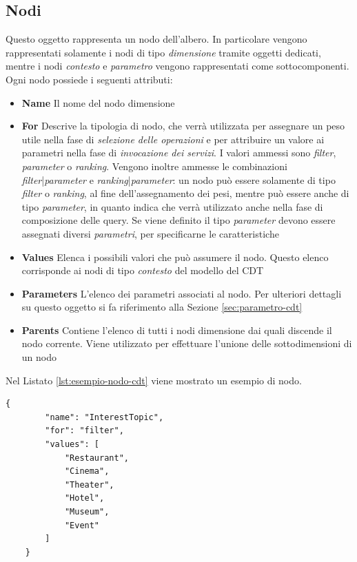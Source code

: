 \subsection{Nodi\label{sec:nodo-cdt}}

Questo oggetto rappresenta un nodo dell'albero. In particolare vengono rappresentati solamente i nodi di tipo \emph{dimensione} tramite oggetti dedicati, mentre i nodi \emph{contesto} e \emph{parametro} vengono rappresentati come sottocomponenti. Ogni nodo possiede i seguenti attributi:

\begin{itemize}
	\item \textbf{Name} Il nome del nodo dimensione
	\item \textbf{For} Descrive la tipologia di nodo, che verrà utilizzata per assegnare un peso utile nella fase di \emph{selezione delle operazioni} e per attribuire un valore ai parametri nella fase di \emph{invocazione dei servizi}. I valori ammessi sono \emph{filter}, \emph{parameter} o \emph{ranking}. Vengono inoltre ammesse le combinazioni \emph{filter}|\emph{parameter} e \emph{ranking}|\emph{parameter}: un nodo può essere solamente di tipo \emph{filter} o \emph{ranking}, al fine dell'assegnamento dei pesi, mentre può essere anche di tipo \emph{parameter}, in quanto indica che verrà utilizzato anche nella fase di composizione delle query. Se viene definito il tipo \emph{parameter} devono essere assegnati diversi \emph{parametri}, per specificarne le caratteristiche
	\item \textbf{Values} Elenca i possibili valori che può assumere il nodo. Questo elenco corrisponde ai nodi di tipo \emph{contesto} del modello del CDT
	\item \textbf{Parameters} L'elenco dei parametri associati al nodo. Per ulteriori dettagli su questo oggetto si fa riferimento alla Sezione \ref{sec:parametro-cdt}
	\item \textbf{Parents} Contiene l'elenco di tutti i nodi dimensione dai quali discende il nodo corrente. Viene utilizzato per effettuare l'unione delle sottodimensioni di un nodo
\end{itemize}

Nel Listato \ref{lst:esempio-nodo-cdt} viene mostrato un esempio di nodo.

\begin{lstlisting}[style=blocco-esempi,
								caption=Esempio di nodo del CDT,
								label=lst:esempio-nodo-cdt]
	{
		"name": "InterestTopic",
		"for": "filter",
		"values": [
			"Restaurant",
			"Cinema",
			"Theater",
			"Hotel",
			"Museum",
			"Event"
		]
	}
\end{lstlisting}

